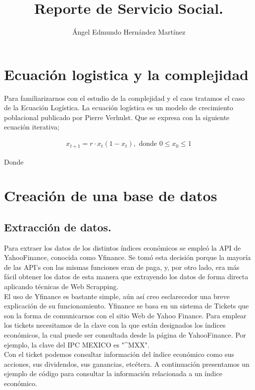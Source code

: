 \documentclass[10pt,a4paper]{article}
\author{Ángel Edmundo Hernández Martínez}
\title{Reporte de Servicio Social.}
\date{}
\begin{document}
\maketitle

\section{Ecuación logistica y la complejidad}

	Para familiarizarnos con el estudio de la complejidad y el caos tratamos el caso de la Ecuación Logística. 
	La ecuación logística es un modelo de crecimiento poblacional publicado por Pierre Verhulst. Que se expresa con la siguiente ecuación iterativa;
	
	\begin{align*}
	x_{t+1} =  r\cdot x_{t}(1 - x_t), \text{ donde } 0 \leq x_0 \leq 1 
	\end{align*}


	Donde 

\section{Creación de una base de datos}

	\subsection{Extracción de datos.}

		Para extraer los datos de los distintos índices económicos se empleó la API de YahooFinance, conocida como Yfinance. Se tomó esta decisión porque la mayoría de las API's con las mismas funciones eran de paga, y, por otro lado, era más fácil obtener los datos de esta manera que extrayendo los datos de forma directa aplicando técnicas de Web Scrapping. \\
		
		El uso de Yfinance es bastante simple, aún así creo esclarecedor una breve explicación de su funcionamiento. Yfinance se basa en un sistema de Tickets que son la forma de comunicarnos con el sitio Web de Yahoo Finance. Para emplear los tickets necesitamos de la clave con la que están designados los índices económicos, la cual puede ser consultada desde la página de YahooFinance. Por ejemplo, la clave del IPC MEXICO es "\^{}MXX". \\
		
		Con el ticket podemos consultar información del índice económico como sus acciones, sus dividendos, sus ganancias, etcétera. A continuación presentamos un ejemplo de código para consultar la información relacionada a un índice económico. \\
		
\end{document}
